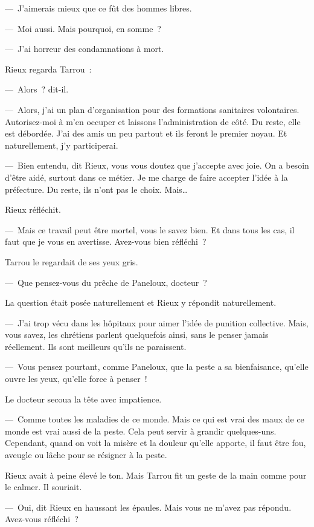 \documentclass[french,twoside]{book} %
\begin{document}
— J’aimerais mieux que ce fût des hommes libres.\par
— Moi aussi. Mais pourquoi, en somme ?\par
— J’ai horreur des condamnations à mort.\par
Rieux regarda Tarrou :\par
— Alors ? dit-il.\par
— Alors, j’ai un plan d’organisation pour des formations sanitaires volontaires. Autorisez-moi à m’en occuper et laissons l’administration de côté. Du reste, elle est débordée. J’ai des amis un peu partout et ils feront le premier noyau. Et naturellement, j’y participerai.\par
— Bien entendu, dit Rieux, vous vous doutez que j’accepte avec joie. On a besoin d’être aidé, surtout dans ce métier. Je me charge de faire accepter l’idée à la préfecture. Du reste, ils n’ont pas le choix. Mais…\par
Rieux réfléchit.\par
— Mais ce travail peut être mortel, vous le savez bien. Et dans tous les cas, il faut que je vous en avertisse. Avez-vous bien réfléchi ?\par
Tarrou le regardait de ses yeux gris.\par
— Que pensez-vous du prêche de Paneloux, docteur ?\par
La question était posée naturellement et Rieux y répondit naturellement.\par
— J’ai trop vécu dans les hôpitaux pour aimer l’idée de punition collective. Mais, vous savez, les chrétiens parlent quelquefois ainsi, sans le penser jamais réellement. Ils sont meilleurs qu’ils ne paraissent.\par
— Vous pensez pourtant, comme Paneloux, que la peste a sa bienfaisance, qu’elle ouvre les yeux, qu’elle force à penser !\par
Le docteur secoua la tête avec impatience.\par
— Comme toutes les maladies de ce monde. Mais ce qui est vrai des maux de ce monde est vrai aussi de la peste. Cela peut servir à grandir quelques-uns. Cependant, quand on voit la misère et la douleur qu’elle apporte, il faut être fou, aveugle ou lâche pour se résigner à la peste.\par
Rieux avait à peine élevé le ton. Mais Tarrou fit un geste de la main comme pour le calmer. Il souriait.\par
— Oui, dit Rieux en haussant les épaules. Mais vous ne m’avez pas répondu. Avez-vous réfléchi ?\par
\end{document}
